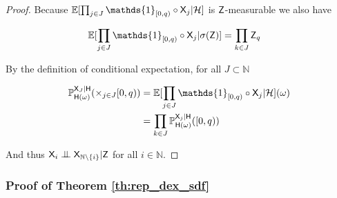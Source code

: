 \begin{proof}
Because $\mathbb{E}[\prod_{j\in J} \mathds{1}_{[0,q)}\circ \RV{X}_j|\sigalg{H}]$ is $\mathsf{Z}$-measurable we also have

\begin{align}
    \mathbb{E}[\prod_{j\in J} \mathds{1}_{[0,q)}\circ \RV{X}_j|\sigma(\RV{Z})] &= \prod_{k\in J} \RV{Z}_q
\end{align}

By the definition of conditional expectation, for all $J\subset \mathbb{N}$

\begin{align}
    \prob{P}_{\RV{H}(\omega)}^{\RV{X}_J|\RV{H}}(\times_{j\in J}[0,q)) &= \mathbb{E}[\prod_{j\in J} \mathds{1}_{[0,q)}\circ \RV{X}_j|\sigalg{H}](\omega)\\
                                                                      &= \prod_{k\in J} \prob{P}_{\RV{H}(\omega)}^{\RV{X}_j|\RV{H}}([0,q))
\end{align}

And thus $\RV{X}_i\CI\RV{X}_{\mathbb{N}\setminus\{i\}}|\RV{Z}$ for all $i\in\mathbb{N}$.
\end{proof}


\subsubsection{Proof of Theorem \ref{th:rep_dex_sdf}}\label{sec:rep_dex_sdf}






